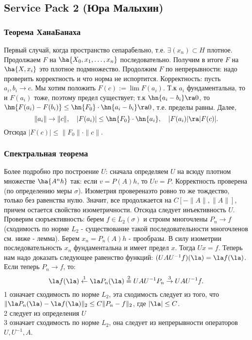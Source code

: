 \documentclass[a4paper]{article}
\begin{document}
\subsection{Service Pack 2 (Юра Малыхин)}

\subsubsection{Теорема Хана\ч Банаха}

Первый случай, когда пространство сепарабельно, т.е. $\exi (x_n)\subset H$ плотное.
Продолжаем $F$ на $\ha{X_0,x_1,\ldots,x_n}$ последовательно. Получим в итоге $F$ на $\ha{X,x_i}$\т
это плотное подмножество. Продолжим $F$ по непрерывности: надо проверить корректность и что норма
не испортится. Корректность: пусть $a_i,b_i\to c$. Мы хотим положить $F(c):=\lim F(a_i)$. Т.к $a_i$
фундаментальна, то и $F(a_i)$ тоже, поэтому предел существует; т.к
$\hn{a_i-b_i}\ra 0$, то $\hm{F(a_i)-F(b_i)} \le \hn{F_0}\cdot \hn{a_i-b_i} \ra 0$, т.е.
пределы равны. Далее,
$$\|a_i\|\to \|c\|, \quad |F(a_i)|\le \hn{F_0}\cdot \hn{a_i}, \quad |F(a_i)|\ra|F(c)|.$$
Отсюда $|F(c)|\le \|F_0\|\cdot \|c\|$.


\subsubsection{Спектральная теорема}

Более подробно про построение $U$: сначала определяем $U$ на всюду плотном множестве $\ha{A^n h}$ так: если
$v=P(A)h$, то $Uv=P$.  Корректность проверена (по определению меры $\sigma$). Изометрия проверена\т это ровно
то же тождество, только без равенства нулю. Значит, все продолжается на $C[-\|A\|,\|A\|]$, причем остается
свойство изометричности. Отсюда следует инъективность $U$. Проверим сюръективность: берем $f\in L_2(\sigma)$
и строим многочлены $P_n\to f$ (сходимость по норме $L_2$ - существование такой последовательности
многочленов см. ниже - лемма). Берем $x_n=P_n(A)h$ - прообразы. В силу изометрии последовательность $x_n$
фундаментальна и имеет предел $x$. Тогда $Ux=f$. Теперь нам надо доказать следующее равенство функций:
$(UAU^{-1}f)(\la)=\la f(\la)$. Если теперь $P_n\to f$, то:
$$\la f(\la)\stackrel{1}{\gets} \la P_n(\la)\stackrel{2}=
UAU^{-1}P_n\stackrel{3}{\to}UAU^{-1}f.$$
1 означает сходимость по норме $L_2$, эта сходимость следует из того, что
$\|\la P_n(\la)-\la f(\la)\|_2 \le C\|P_n-f\|_2$, где $|\la|\le C$.\\
2 следует из определения $U$\\
3 означает сходимость по норме $L_2$, она следует из непрерывности операторов $U, U^{-1}, A$.
\end{document}
